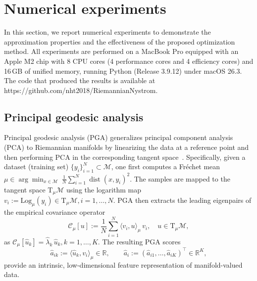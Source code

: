 \documentclass[final,onefignum,onetabnum]{siamart250211}
\begin{document}
\section{Numerical experiments} \label{sec:experiments}
In this section, we report numerical experiments to demonstrate the approximation properties and the effectiveness of the proposed optimization method. All experiments are performed on a MacBook Pro equipped with an Apple M2 chip with 8 CPU cores (4 performance cores and 4 efficiency cores) and 16\,GB of unified memory, running Python (Release 3.9.12) under macOS 26.3. The code that produced the results is available at https://github.com/nht2018/RiemannianNystrom.


\subsection{Principal geodesic analysis}
\label{app:pga}
Principal geodesic analysis (PGA) generalizes principal component analysis (PCA) to Riemannian manifolds by linearizing the data at a reference point and then performing PCA in the corresponding tangent space~\cite{fletcher2004principal,Pennec2006}. Specifically, given a dataset (training set) $\{y_i\}_{i=1}^N\subset\mathcal M$, one first computes a Fr\'{e}chet mean
$
  \mu\in\arg\min_{x\in\mathcal M}\ \frac{1}{N}\sum_{i=1}^N \operatorname{dist}(x,y_i)^2.
$
The samples are mapped to the tangent space $\mathrm{T}_\mu\mathcal M$ using the logarithm map
$
  v_i := \mathrm{Log}_\mu(y_i) \in \mathrm{T}_\mu\mathcal M, i=1,\dots,N.
$
PGA then extracts the leading eigenpairs of the empirical covariance operator 
\begin{equation}
  \mathcal{C}_\mu[u] := \frac{1}{N} \sum_{i=1}^N \langle v_i, u \rangle_\mu\, v_i, \quad u\in \mathrm{T}_\mu\mathcal M,
\end{equation}
as
$
  \mathcal C_\mu[\widehat u_k]=\widehat\lambda_k\,\widehat u_k, k=1,\dots,K
$. 
The resulting PGA scores
\begin{equation}
  \label{eq:pga-scores}
  \widehat a_{ik} := \langle \widehat u_k, v_i\rangle_\mu\in\mathbb R,\qquad \widehat a_i:=(\widehat a_{i1},\dots,\widehat a_{iK})^\top\in\mathbb R^K,
\end{equation}
provide an intrinsic, low-dimensional feature representation of manifold-valued data. 
\end{document}
